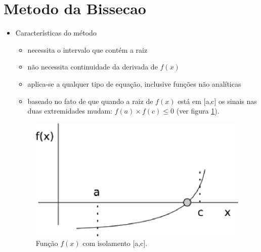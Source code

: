 \section{Metodo da Bissecao}

\begin{itemize}

\item Características do método
 \begin{itemize}
  \item necessita o intervalo que contém a raiz
  \item não necessita continuidade da derivada de $f(x)$
  \item aplica-se a qualquer tipo de equação, inclusive funções não analíticas
  \item baseado no fato de que quando a raiz de $f(x)$ está em [a,c] os sinais nas duas extremidades mudam: $f(a) \times f(c) \leq 0$ (ver figura \ref{fig:bissecao1}).
 \end{itemize}

\begin{figure}[htb]
  \setlength{\abovecaptionskip}{20pt}
  \centering
  \includegraphics[scale=0.5]{capitulos/capitulo1/figuras/bissecao1.eps}
  \caption{Função $f(x)$ com isolamento [a,c].}
  \label{fig:bissecao1}
\end{figure}

\end{itemize}

